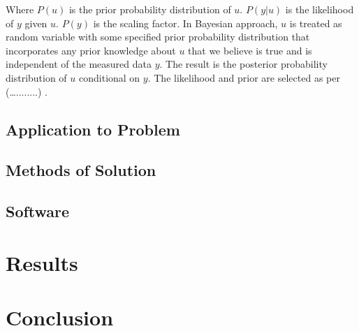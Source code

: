 \documentclass[10pt]{ubthesis}
\begin{document}
 \bigskip
 
\noindent Where $P(u)$ is the prior probability distribution of $u$. $P(y|u)$ is the likelihood of $y$ given $u$. $P(y)$ is the scaling factor. 
 \noindent In Bayesian approach, $u$ is treated as random variable with some specified prior probability distribution that incorporates any prior knowledge about $u$ that we believe is true and is independent of the measured data $y$. The result is the posterior probability distribution of $u$ conditional on $y$. The likelihood and prior are selected as per (…........) .

\section{Application to Problem}
\section{Methods of Solution}
\section{Software}
\chapter{Results}
\chapter{Conclusion}
%
%
\end{document}
